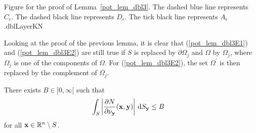 {Figure for the proof of Lemma~\ref{pot_lem_dbl3}.  The dashed blue
line represents $C_\epsilon$.  The dashed black line represents
$D_\epsilon$.  The tick black line represents $A_\epsilon$.}{dblLayerKN}

\begin{rmk}
Looking at the proof of the previous lemma, it is clear that
(\ref{pot_lem_dbl3E1}) and (\ref{pot_lem_dbl3E2}) are still true if
$S$ is replaced by $\partial \Omega_j$ and $\Omega$ by $\Omega_j$,
where $\Omega_j$ is one of the components of $\Omega$.  For
(\ref{pot_lem_dbl3E2}), the set $\Omega^{\prime}$ is then replaced by
the complement of $\overline{\Omega_j}$.     \label{pot_lem_dbl3_rmk}
\end{rmk}

\begin{lemma} \label{pot_lem_dbl4}
There exists $B \in ]0,\infty[$ such that 
\[
\int_S \left| \frac{\partial{N}}{\partial \mathbf{\nu}_{\mathbf{y}}}(\mathbf{x},\mathbf{y})
\right| \,\mathrm{d}{S}_{\mathbf{y}} \leq B
\]
for all $\mathbf{x} \in \mathbb{R}^n\setminus S$.
\end{lemma}

